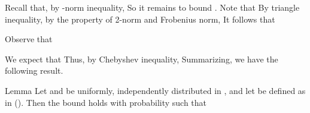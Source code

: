Recall that, by -norm inequality,
So it remains to bound .
Note that
By triangle inequality, by the property of 2-norm and Frobenius norm,
It follows that

Observe that

We expect that
Thus, by Chebyshev inequality,
Summarizing, we have the following result.

\Result
{Lemma}
{
Let \m {\f} and \m {\th} be uniformly, independently distributed in \m {[0,2\pi)},
and let  be defined as in ().
Then the bound
holds with probability  such that
}

\stopsubsection
\stopsection

